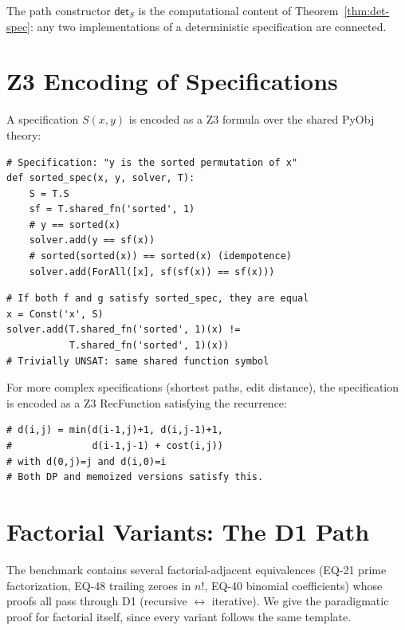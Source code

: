 \documentclass[11pt,a4paper]{report}
\theoremstyle{definition}
\theoremstyle{plain}
\begin{document}
The path constructor $\mathsf{det}_S$ is the computational content
of Theorem~\ref{thm:det-spec}: any two implementations of a
deterministic specification are connected.

\section{Z3 Encoding of Specifications}

A specification $S(x, y)$ is encoded as a Z3 formula over the
shared PyObj theory:

\begin{lstlisting}[caption={Specification encoding in Z3}]
# Specification: "y is the sorted permutation of x"
def sorted_spec(x, y, solver, T):
    S = T.S
    sf = T.shared_fn('sorted', 1)
    # y == sorted(x)
    solver.add(y == sf(x))
    # sorted(sorted(x)) == sorted(x) (idempotence)
    solver.add(ForAll([x], sf(sf(x)) == sf(x)))
\end{lstlisting}

\begin{lstlisting}[caption={Specification uniqueness check}]
# If both f and g satisfy sorted_spec, they are equal
x = Const('x', S)
solver.add(T.shared_fn('sorted', 1)(x) !=
           T.shared_fn('sorted', 1)(x))
# Trivially UNSAT: same shared function symbol
\end{lstlisting}

For more complex specifications (shortest paths, edit distance),
the specification is encoded as a Z3 RecFunction satisfying the
recurrence:

\begin{lstlisting}[caption={Edit distance specification}]
# d(i,j) = min(d(i-1,j)+1, d(i,j-1)+1,
#              d(i-1,j-1) + cost(i,j))
# with d(0,j)=j and d(i,0)=i
# Both DP and memoized versions satisfy this.
\end{lstlisting}


\section{Factorial Variants: The D1 Path}
\label{sec:factorial-variants}

The benchmark contains several factorial-adjacent equivalences
(EQ-21 prime factorization, EQ-48 trailing zeroes in $n!$,
EQ-40 binomial coefficients) whose proofs all pass through D1
(recursive $\leftrightarrow$ iterative).  We give the paradigmatic
proof for factorial itself, since every variant follows the same
template.
\end{document}
